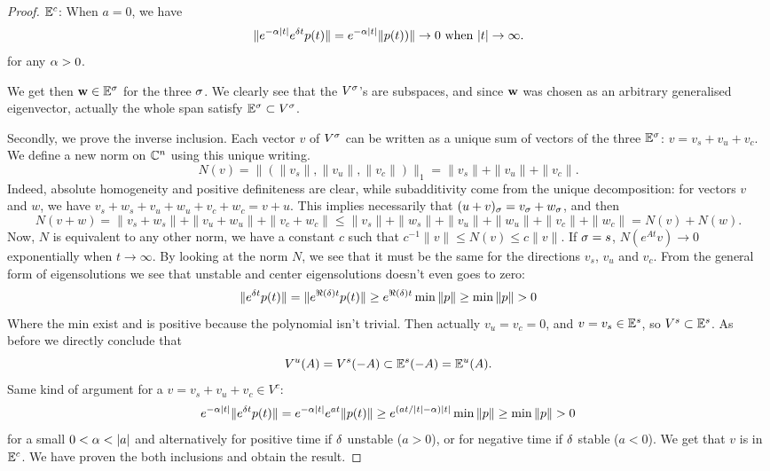 \begin{proof}
$\mathbb{E}^c$: When $a=0$, we have
$$\|e^{-\alpha |t|}e^{\delta t}p(t)\|
= e^{-\alpha |t|}\|p(t))\| \to0 \text{ when }|t|\to\infty.$$
for any $\alpha>0$. 

We get then $\mathbf{w} \in \mathbb{E}^\sigma$ for the three $\sigma$. We clearly see that the $V^\sigma$'s are subspaces, and since $\mathbf{w}$ was chosen as an arbitrary generalised eigenvector, actually the whole span satisfy $\mathbb{E}^\sigma\subset V^\sigma$.

Secondly, we prove the inverse inclusion.
Each vector $v$ of $V^\sigma$ can be written as a unique sum of vectors of the three $\mathbb{E}^\sigma$: $v = v_s + v_u + v_c$. We define a new norm on $\mathbb{C}^n$ using this unique writing. 
$$N(v)= \big\|(\|v_s\|,\|v_u\|,\|v_c\|)\big\|_1 = \|v_s\|+\|v_u\|+\|v_c\|.$$ Indeed, absolute homogeneity and positive definiteness are clear, while subadditivity come from the unique decomposition: for vectors $v$ and $w$, we have $v_s+w_s + v_u+w_u + v_c+w_c=v+u$. This implies necessarily that $(u+v)_\sigma=v_\sigma + w_\sigma$, and then
$$N(v+w) = \|v_s+w_s\|+\|v_u+w_u\|+\|v_c+w_c\| \leq \|v_s\|+\|w_s\|+\|v_u\|+\|w_u\|+\|v_c\|+ \|w_c\|= N(v)+N(w).$$
Now, $N$ is equivalent to any other norm, \ie we have a constant $c$ such that $c^{-1}\|v\|\leq N(v)\leq c\|v\|$.
If $\sigma=s$, $N(e^{At}v)\to0$ exponentially when $t\to\infty$. By looking at the norm $N$, we see that it must be the same for the directions $v_s$, $v_u$ and $v_c$. From the general form of eigensolutions we see that unstable and center eigensolutions doesn't even goes to zero: 
$$\|e^{\d t}p(t)\|
=\|e^{\Re(\d)t}p(t)\|
\geq e^{\Re(\d)t}\min\|p\|\geq \min\|p\|>0$$
Where the min exist and is positive because the polynomial isn't trivial. Then actually $v_u=v_c=0$, and $v = v_s\in \mathbb{E}^s$, so $V^s\subset \mathbb{E}^s$. As before we directly conclude that $$V^u(A)=V^s(-A)\subset \mathbb{E}^s(-A)=\mathbb{E}^u(A).$$ Same kind of argument for a $v=v_s+v_u+v_c\in V^c$: 
$$e^{-\a|t|}\|e^{\d t}p(t)\|
=e^{-\a|t|}e^{at}\|p(t)\|
\geq e^{(at/|t|-\a)|t|}\min\|p\|\geq \min\|p\|>0$$
for a small $0<\a<|a|$ and alternatively for positive time if $\delta$ unstable ($a>0$), or for negative time if $\delta$ stable ($a<0$). We get that $v$ is in $\mathbb{E}^c$.
We have proven the both inclusions and obtain the result.
\end{proof}

